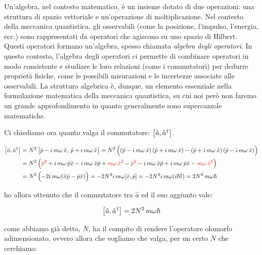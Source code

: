 \begin{myapprf}
	Un'algebra, nel contesto matematico, è un insieme dotato di due operazioni: una struttura di spazio vettoriale e un'operazione di moltiplicazione.
	Nel contesto della meccanica quantistica, gli osservabili (come la posizione, l'impulso, l'energia, ecc.) sono rappresentati da operatori che agiscono su uno spazio di Hilbert. Questi operatori formano un'algebra, spesso chiamata \textit{algebra degli operatori}. In questo contesto, l'algebra degli operatori ci permette di combinare operatori in modo consistente e studiare le loro relazioni (come i commutatori) per dedurre proprietà fisiche, come le possibili misurazioni e le incertezze associate alle osservabili. La struttura algebrica è, dunque, un elemento essenziale nella formulazione matematica della meccanica quantistica, su cui noi però non faremo un grande approfondimento in quanto generalmente sono supercazzole matematiche.
\end{myapprf}
	
	Ci chiediamo ora quanto valga il commutatore: $\qty[\hat{a}, \hat{a}^{\dagger}]$.
	
\begin{align*}
	\qty[\hat{a}, \hat{a}^{\dagger}] & = N^2 \, \qty\big[ \hat{p} - i\, m\omega \, \hat{x}, \, \hat{p} + i\, m\omega \, \hat{x}  ] = N^2 \, \qty\Big(   \qty(\hat{p} - i\, m\omega \, \hat{x}) \, \qty(\hat{p} + i\, m\omega \, \hat{x})  -    \qty(\hat{p} + i\, m\omega \, \hat{x})     \, \qty(\hat{p} - i\, m\omega \, \hat{x})        ) \\
	& = N^2 \, \qty\Big( \textcolor{red}{ \hat{p}^2} + i\,m\omega \, \hat{p}\hat{x} - i\,m\omega \, \hat{x}\hat{p} + \textcolor{red}{ m\omega \, \hat{x}^2  } - \textcolor{red}{ \hat{p}^2} - i\,m\omega \, \hat{x}\hat{p} + i\,m\omega \, \hat{p}\hat{x}  - \textcolor{red}{ m\omega \, \hat{x}^2  }  ) \\
	& = N^2 \, \qty\Big( -2i \, m\omega \qty(\hat{x}\hat{p} - \hat{p} \hat{x})  ) = - 2N^2i \, m\omega \qty[\hat{x}, \hat{p}] = - 2N^2i \, m\omega \qty( i \hbar \mathbb{I}) = 2N^2 \, m\omega \hbar
\end{align*}

	ho allora ottenuto che il commutatore tra $\hat{a}$ ed il suo aggiunto vale:
	
\begin{align*}
	\qty[\hat{a}, \hat{a}^{\dagger}] = 2N^2 \, m\omega \hbar 
\end{align*}

	come abbiamo già detto, $N$, ha il compito di rendere l'operatore olomorfo adimensionato, ovvero allora che vogliamo che valga, per un certo $N$ che cerchiamo:

